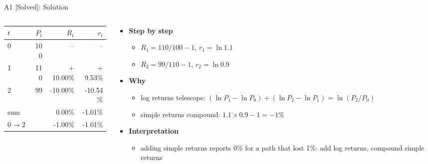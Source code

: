 \begin{frame}{A1 [Solved]: Solution}
\itemsize{\small}
\begin{columns}[T]
\begin{column}{0.42\textwidth}
\begin{center}
\footnotesize
\begin{tabular}{lrrr}
\toprule
$t$ & $P_t$ & $R_t$ & $r_t$ \\
\midrule
0 & 100 & -- & -- \\
1 & 110 & $+$10.00\% & $+$9.53\% \\
2 & 99 & -10.00\% & -10.54\% \\
\midrule sum & & 0.00\% & -1.01\% \\
$0 \to 2$ & & -1.00\% & -1.01\% \\
\bottomrule
\end{tabular}
\end{center}

\end{column}
\begin{column}{0.55\textwidth}
\begin{itemize}
    \item \textbf{Step by step}
    \begin{itemize}
        \item $R_1 = 110/100 - 1$, $r_1 = \ln 1.1$
        \item $R_2 = 99/110 - 1$, $r_2 = \ln 0.9$
    \end{itemize}
    \item \textbf{Why}
    \begin{itemize}
        \item log returns telescope: $(\ln P_1 - \ln P_0) + (\ln P_2 - \ln P_1) = \ln(P_2/P_0)$
        \item simple returns compound: $1.1 \times 0.9 - 1 = -1\%$
    \end{itemize}
    \item \textbf{Interpretation}
    \begin{itemize}
        \item adding simple returns reports 0\% for a path that lost 1\%: add log returns, compound simple returns
    \end{itemize}
\end{itemize}
\end{column}
\end{columns}
\end{frame}


